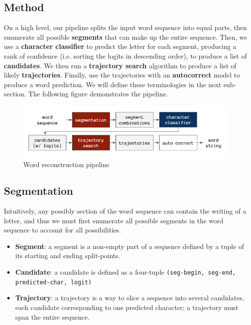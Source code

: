 \documentclass{article}
\begin{document}
\begin{multicols*}{2}
\section{Method}

On a high level, our pipeline splits the input word sequence into equal parts, then enumerate all possible \textbf{segments} that can make up the entire sequence. Then, we use a \textbf{character classifier} to predict the letter for each segment, producing a rank of confidence (i.e. sorting the logits in descending order), to produce a list of \textbf{candidates}. We then run a \textbf{trajectory search} algorithm to produce a list of likely \textbf{trajectories}. Finally, use the trajectories with an \textbf{autocorrect} model to produce a word prediction. We will define these terminologies in the next sub-section. The following figure demonstrates the pipeline.

\begin{figure}[H]
    \centering
    \includegraphics[scale = 0.3]{pipeline.png}
    \caption{Word reconstruction pipeline}
\end{figure}

\subsection{Segmentation}

Intuitively, any possibly section of the word sequence can contain the writing of a letter, and thus we must first enumerate all possible segments in the word sequence to account for all possibilities. 

\begin{itemize}[leftmargin=*]
    \item \textbf{Segment}: a segment is a non-empty part of a sequence defined by a tuple of its starting and ending split-points.
    \item \textbf{Candidate}: a candidate is defined as a four-tuple \texttt{(seg-begin, seg-end, predicted-char, logit)}
    \item \textbf{Trajectory}: a trajectory is a way to slice a sequence into several candidates, each candidate corresponding to one predicted character; a trajectory must span the entire sequence.
\end{itemize}


\end{multicols*}
\end{document}
